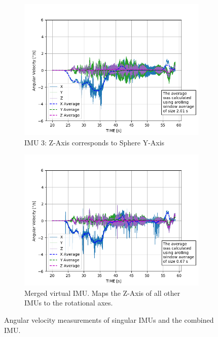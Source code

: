 \documentclass[graybox]{svmono}
\newcommand{\1}{\mathbbm{1}}                 %
\begin{document}
\begin{figure}
\begin{subfigure}{0.45\textwidth}
\includegraphics[width=\textwidth]{./plotsAndScripts/angVel-2020-01-29-16-14-54/imu3_ang_vel}
\caption{IMU 3: Z-Axis corresponds to Sphere Y-Axis}
\label{sec:technicalApproach:fig:imu3_ang_vel}
\end{subfigure}\hfill
\begin{subfigure}{0.45\textwidth}
\includegraphics[width=\textwidth]{./plotsAndScripts/angVel-2020-01-29-16-14-54/merged_ang_vel}
\caption{Merged virtual IMU. Maps the Z-Axis of all other IMUs to the rotational axes.}
\label{sec:technicalApproach:fig:merged_ang_vel}
\end{subfigure}\hfill
\caption{Angular velocity measurements of singular IMUs and the combined IMU.}
\label{sec:technicalApproach:fig:angvel}
\end{figure}
\end{document}
